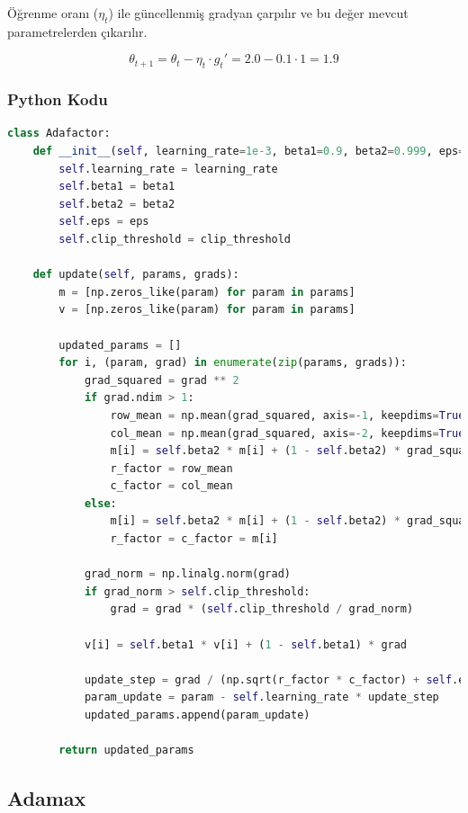 Öğrenme oranı ($\eta_t$) ile güncellenmiş gradyan çarpılır ve bu değer mevcut parametrelerden çıkarılır.

\[ \theta_{t + 1} = \theta_t - \eta_t \cdot g_{t}' = 2.0 - 0.1 \cdot 1 = 1.9 \]

\subsubsection{Python Kodu}

\begin{lstlisting}[language=Python]
class Adafactor:
    def __init__(self, learning_rate=1e-3, beta1=0.9, beta2=0.999, eps=1e-8, clip_threshold=1.0):
        self.learning_rate = learning_rate
        self.beta1 = beta1
        self.beta2 = beta2
        self.eps = eps
        self.clip_threshold = clip_threshold
    
    def update(self, params, grads):
        m = [np.zeros_like(param) for param in params]
        v = [np.zeros_like(param) for param in params]

        updated_params = []
        for i, (param, grad) in enumerate(zip(params, grads)):
            grad_squared = grad ** 2
            if grad.ndim > 1:
                row_mean = np.mean(grad_squared, axis=-1, keepdims=True)
                col_mean = np.mean(grad_squared, axis=-2, keepdims=True)
                m[i] = self.beta2 * m[i] + (1 - self.beta2) * grad_squared
                r_factor = row_mean
                c_factor = col_mean
            else:
                m[i] = self.beta2 * m[i] + (1 - self.beta2) * grad_squared
                r_factor = c_factor = m[i]

            grad_norm = np.linalg.norm(grad)
            if grad_norm > self.clip_threshold:
                grad = grad * (self.clip_threshold / grad_norm)

            v[i] = self.beta1 * v[i] + (1 - self.beta1) * grad

            update_step = grad / (np.sqrt(r_factor * c_factor) + self.eps)
            param_update = param - self.learning_rate * update_step
            updated_params.append(param_update)

        return updated_params
\end{lstlisting}

\newpage

\subsection{Adamax}

